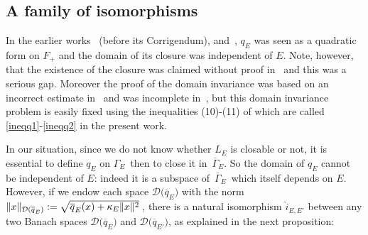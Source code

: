 \documentclass[12pt,reqno]{amsart}
\renewcommand{\(}{\left(}
\renewcommand{\)}{\right)}
\begin{document}
\subsection{A family of isomorphisms}\label{isom}

In the earlier works~\cite{DES00a} (before its Corrigendum), \cite{EstLos-07,EstLos-08} and~\cite{SST20}, $q_E$ was seen as a quadratic form on $F_+$ and the domain of its closure was independent of $E$. Note, however, that the existence of the closure was claimed without proof in~\cite{DES00a} and this was a serious gap. Moreover the proof of the domain invariance was based on an incorrect estimate in~\cite[Proposition 2]{EstLos-07} and was incomplete in~\cite{EstLos-08}, but this domain invariance problem is easily fixed using the inequalities (10)-(11) of \cite{DES00a} which are called \eqref{ineqq1}-\eqref{ineqq2} in the present work.

In our situation, since we do not know whether $L_E$ is closable or not, it is essential to define $q_E$ on $\Gamma_E\,$ then to close it in~$\overline \Gamma_E$.
So the domain of ${q}_E$ cannot be independent of $E$: indeed it is a subspace of $\,\overline{\Gamma}_E\,$ which itself depends on $E$. However, if we endow each space $\mathcal D\big(\overline{q}_E\big)$ with the norm $\Vert x\Vert_{\mathcal D(\small{\overline{q}_E})}:=\sqrt{\overline{q}_E(x)+\kappa_E\Vert x\Vert^2}\,$,
there is a natural isomorphism $\hat{i}_{E,E'}$ between any two Banach spaces $\mathcal D\big(\overline{q}_E\big)$ and $\mathcal D\big(\overline{q}_{E'}\big)$, as explained in the next proposition:
\end{document}
